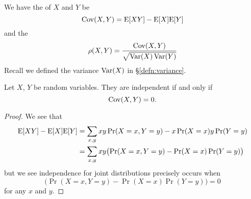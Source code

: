 We have the  of $X$ and $Y$ be
\begin{equation}
\mathop{\mathrm{Cov}}\nolimits(X,Y)=\mathrm{E}[XY]-\mathrm{E}[X]\mathrm{E}[Y]
\end{equation}
and the 
\begin{equation}
\rho(X,Y)=\frac{\mathop{\mathrm{Cov}}\nolimits(X,Y)}{\sqrt{\mathop{\mathrm{Var}}\nolimits(X)\mathop{\mathrm{Var}}\nolimits(Y)}}
\end{equation}
Recall we defined the variance $\mathop{\mathrm{Var}}\nolimits(X)$ in \S\ref{defn:variance}.

\begin{lemma}
Let $X$, $Y$ be random variables. They are independent if and only if 
\begin{equation}
\mathop{\mathrm{Cov}}\nolimits(X,Y)=0.
\end{equation}
\end{lemma}
\begin{proof}
We see that
\begin{equation}
\begin{split}
\mathrm{E}[XY]-\mathrm{E}[X]\mathrm{E}[Y]
&=\sum_{x,y}xy\mathop{\mathrm{Pr}}\nolimits(X=x,Y=y)-x\mathop{\mathrm{Pr}}\nolimits(X=x)y\mathop{\mathrm{Pr}}\nolimits(Y=y)\\
&=\sum_{x,y}xy\bigl(\mathop{\mathrm{Pr}}\nolimits(X=x,Y=y)-\mathop{\mathrm{Pr}}\nolimits(X=x)\mathop{\mathrm{Pr}}\nolimits(Y=y)\bigr)
\end{split}
\end{equation}
but we see independence for joint distributions precisely occurs when
\begin{equation}
\bigl(\Pr(X=x,Y=y)-\Pr(X=x)\Pr(Y=y)\bigr)=0
\end{equation}
for any $x$ and $y$.
\end{proof}

